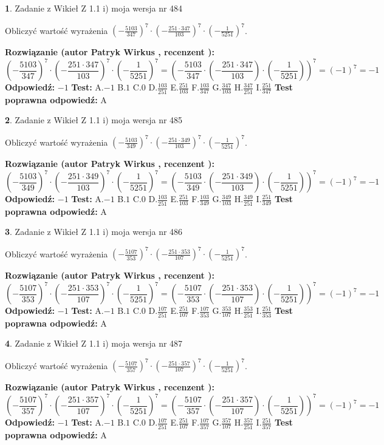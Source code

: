 \documentclass[12pt, a4paper]{article}
\theoremstyle{definition} %
\newtheorem{zad}{}
\newcommand{\zadStart}[1]{\begin{zad}#1\newline}
\newcommand{\zadStop}{\end{zad}}
\newcommand{\rozwStart}[2]{\noindent \textbf{Rozwiązanie (autor #1 , recenzent #2): }\newline}
\newcommand{\rozwStop}{\newline}
\newcommand{\odpStart}{\noindent \textbf{Odpowiedź:}\newline}
\newcommand{\odpStop}{\newline}
\newcommand{\testStart}{\noindent \textbf{Test:}\newline}
\newcommand{\testStop}{\newline}
\newcommand{\kluczStart}{\noindent \textbf{Test poprawna odpowiedź:}\newline}
\newcommand{\kluczStop}{\newline}
\begin{document}
\zadStart{Zadanie z Wikieł Z 1.1 i) moja wersja nr 484}

Obliczyć wartość wyrażenia $(-\frac{5103}{347})^{7} \cdot (-\frac{251 \cdot 347}{103})^{7} \cdot (-\frac{1}{5251})^{7}$.
\zadStop
\rozwStart{Patryk Wirkus}{}
$$(-\frac{5103}{347})^{7} \cdot (-\frac{251 \cdot 347}{103})^{7} \cdot (-\frac{1}{5251})^{7} = (-\frac{5103}{347} \cdot (-\frac{251 \cdot 347}{103}) \cdot (-\frac{1}{5251}))^{7} = (-1)^{7} = -1$$
\rozwStop
\odpStart
$-1$
\odpStop
\testStart
A.$-1$ B.$1$ C.$0$ D.$\frac{103}{251}$ E.$\frac{251}{103}$
F.$\frac{103}{347}$ G.$\frac{347}{103}$
H.$\frac{347}{251}$
I.$\frac{251}{347}$
\testStop
\kluczStart
A
\kluczStop



\zadStart{Zadanie z Wikieł Z 1.1 i) moja wersja nr 485}

Obliczyć wartość wyrażenia $(-\frac{5103}{349})^{7} \cdot (-\frac{251 \cdot 349}{103})^{7} \cdot (-\frac{1}{5251})^{7}$.
\zadStop
\rozwStart{Patryk Wirkus}{}
$$(-\frac{5103}{349})^{7} \cdot (-\frac{251 \cdot 349}{103})^{7} \cdot (-\frac{1}{5251})^{7} = (-\frac{5103}{349} \cdot (-\frac{251 \cdot 349}{103}) \cdot (-\frac{1}{5251}))^{7} = (-1)^{7} = -1$$
\rozwStop
\odpStart
$-1$
\odpStop
\testStart
A.$-1$ B.$1$ C.$0$ D.$\frac{103}{251}$ E.$\frac{251}{103}$
F.$\frac{103}{349}$ G.$\frac{349}{103}$
H.$\frac{349}{251}$
I.$\frac{251}{349}$
\testStop
\kluczStart
A
\kluczStop



\zadStart{Zadanie z Wikieł Z 1.1 i) moja wersja nr 486}

Obliczyć wartość wyrażenia $(-\frac{5107}{353})^{7} \cdot (-\frac{251 \cdot 353}{107})^{7} \cdot (-\frac{1}{5251})^{7}$.
\zadStop
\rozwStart{Patryk Wirkus}{}
$$(-\frac{5107}{353})^{7} \cdot (-\frac{251 \cdot 353}{107})^{7} \cdot (-\frac{1}{5251})^{7} = (-\frac{5107}{353} \cdot (-\frac{251 \cdot 353}{107}) \cdot (-\frac{1}{5251}))^{7} = (-1)^{7} = -1$$
\rozwStop
\odpStart
$-1$
\odpStop
\testStart
A.$-1$ B.$1$ C.$0$ D.$\frac{107}{251}$ E.$\frac{251}{107}$
F.$\frac{107}{353}$ G.$\frac{353}{107}$
H.$\frac{353}{251}$
I.$\frac{251}{353}$
\testStop
\kluczStart
A
\kluczStop



\zadStart{Zadanie z Wikieł Z 1.1 i) moja wersja nr 487}

Obliczyć wartość wyrażenia $(-\frac{5107}{357})^{7} \cdot (-\frac{251 \cdot 357}{107})^{7} \cdot (-\frac{1}{5251})^{7}$.
\zadStop
\rozwStart{Patryk Wirkus}{}
$$(-\frac{5107}{357})^{7} \cdot (-\frac{251 \cdot 357}{107})^{7} \cdot (-\frac{1}{5251})^{7} = (-\frac{5107}{357} \cdot (-\frac{251 \cdot 357}{107}) \cdot (-\frac{1}{5251}))^{7} = (-1)^{7} = -1$$
\rozwStop
\odpStart
$-1$
\odpStop
\testStart
A.$-1$ B.$1$ C.$0$ D.$\frac{107}{251}$ E.$\frac{251}{107}$
F.$\frac{107}{357}$ G.$\frac{357}{107}$
H.$\frac{357}{251}$
I.$\frac{251}{357}$
\testStop
\kluczStart
A
\kluczStop
\end{document}
